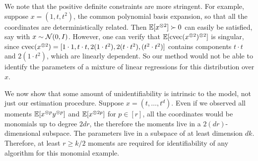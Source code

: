 We note that the positive definite constraints are more stringent.
For example, suppose $x = (1, t, t^2)$,
the common polynomial basis expansion, so that all the coordinates are deterministically related.
Then $\operatorname{\mathbb{E}}[x^{\otimes 2}] \succ 0$ can easily be satisfied, say with $x \sim \mathcal{N}(0, I)$.
However, one can verify that $\operatorname{\mathbb{E}}[\operatorname{cvec}(x^{\otimes 2})^{\otimes 2}]$ is singular,
since $\operatorname{cvec}(x^{\otimes 2}) = [1 \cdot 1, t\cdot t, 2(1 \cdot t^2), 2(t \cdot t^2), (t^2 \cdot t^2)]$ contains
components $t \cdot t$ and $2(1 \cdot t^2)$, which are linearly dependent.
So our method would not be able to identify the parameters of a mixture of
linear regressions for this distribution over $x$.

We now show that some amount of unidentifiability is intrinsic to the model,
not just our estimation procedure.
Suppose $x = (t, \dots, t^d)$.
Even if we observed all moments
$\operatorname{\mathbb{E}}[x^{\otimes p}y^{\otimes p}]$ and $\operatorname{\mathbb{E}}[x^{\otimes 2p}]$ for $p \in [r]$,
all the coordinates would be monomials up to degree $2dr$,
the therefore the moments live in a $2(dr)$-dimensional subspace.
The parameters live in a subspace of at least dimension $dk$.
Therefore, at least $r \ge k/2$ moments are required for identifiability of any
algorithm for this monomial example.





